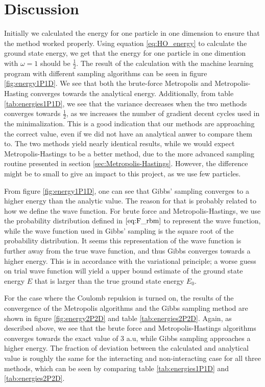 \documentclass[norsk,a4paper,12pt]{article}
\begin{document}
\section{Discussion} \label{sec:Discussion}
Initially we calculated the energy for one particle in one dimension to ensure that the method worked properly. Using equation \ref{eq:HO_energy} to calculate the ground state energy, we get that the energy for one particle in one dimention with $\omega=1$ should be $\frac{1}{2}$. The result of the calculation with the machine learning program with different sampling algorithms can be seen in figure \ref{fig:energy1P1D}. We see that both the  brute-force Metropolis and Metropolis-Hasting converges towards the analytical energy. Additionally, from table \ref{tab:energies1P1D}, we see that the variance decreases when the two methods converges towards $\frac{1}{2}$, as we increases the number of gradient decent cycles used in the minimalization. This is a good indication that our methods are approaching the correct value, even if we did not have an analytical anwer to compare them to. The two methods yield nearly identical results, while we would expect Metropolis-Hastings to be a better method, due to the more advanced sampling routine presented in section \ref{sec:Metropolis-Hastings}. However, the difference might be to small to give an impact to this project, as we use few particles.
\par 
\vspace{3mm}

From figure \ref{fig:energy1P1D}, one can see that Gibbs' sampling converges to a higher energy than the analytic value. The reason for that is probably related to how we define the wave function. For brute force and Metropolis-Hastings, we use the probability distribution defined in $\ref{eq:F_rbm}$ to represent the wave function, while the wave function used in Gibbs' sampling is the square root of the probability distribution. It seems this representation of the wave function is further away from the true wave function, and thus Gibbs converges towards a higher energy. This is in accordance with the variational principle; a worse guess on trial wave function will yield a upper bound estimate of the ground state energy $E$ that is larger than the true ground state energy $E_0$.

\par 
\vspace{3mm}
For the case where the Coulomb repulsion is turned on, the results of the convergence of the Metropolis algorithms and the Gibbs sampling method are shown in figure \ref{fig:energy2P2D} and table \ref{tab:energies2P2D}. Again, as described above, we see that the brute force and Metropolis-Hastings algorithms converges towards the exact value of $3$ a.u, while Gibbs sampling approaches a higher energy. The fraction of deviation between the calculated and analytical value is roughly the same for the interacting and non-interacting case for all three methods, which can be seen by comparing table \ref{tab:energies1P1D} and \ref{tab:energies2P2D}.
\end{document}
